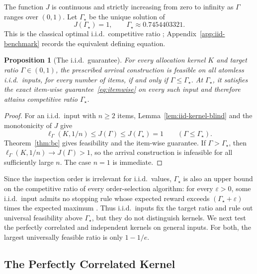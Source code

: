 \documentclass[11pt]{article}
\newtheorem{proposition}[theorem]{Proposition}
\theoremstyle{definition}
\theoremstyle{remark}
\begin{document}
The function $J$ is continuous and strictly increasing from zero to
infinity as $\Gamma$ ranges over $(0,1)$.
Let $\Gamma_\star$ be the unique solution of
\begin{equation}\label{eq:iid-constant}
 J(\Gamma_\star)=1,
 \qquad \Gamma_\star\approx0.7454403321.
\end{equation}
This is the classical optimal i.i.d.\ competitive ratio
\citep{HK82,Kertz86,CFHOV21}; Appendix~\ref{app:iid-benchmark}
records the equivalent defining equation.

\begin{proposition}[The i.i.d.\ guarantee]\label{prop:iid-guarantee}
For every allocation kernel $K$ and target ratio $\Gamma\in(0,1)$,
the prescribed arrival construction is feasible on all atomless
i.i.d.\ inputs, for every number of items,
if and only if $\Gamma\le\Gamma_\star$.
At $\Gamma_\star$, it satisfies the exact item-wise
guarantee~\eqref{eq:itemwise} on every such input and therefore
attains competitive ratio $\Gamma_\star$.
\end{proposition}
\begin{proof}
For an i.i.d.\ input with $n\ge2$ items, Lemma~\ref{lem:iid-kernel-blind}
and the monotonicity of $J$ give
\[
 \ell_\Gamma(K,1/n)\le J(\Gamma)\le J(\Gamma_\star)=1
 \qquad(\Gamma\le\Gamma_\star).
\]
Theorem~\ref{thm:bc} gives feasibility and the item-wise guarantee.
If $\Gamma>\Gamma_\star$, then
$\ell_\Gamma(K,1/n)\to J(\Gamma)>1$, so the arrival construction is
infeasible for all sufficiently large $n$.
The case $n=1$ is immediate.
\end{proof}

Since the inspection order is irrelevant for i.i.d.\ values, $\Gamma_\star$ is also an
upper bound on the competitive ratio of every order-selection algorithm: for every
$\varepsilon>0$, some i.i.d.\ input admits no stopping rule whose expected reward exceeds
$(\Gamma_\star+\varepsilon)$ times the expected maximum \citep{HK82,Kertz86}.
Thus i.i.d.\ inputs fix the target ratio and rule out universal
feasibility above $\Gamma_\star$, but they do not distinguish kernels.
We next test the perfectly correlated and independent kernels on
general inputs.  For both, the largest universally feasible ratio
is only $1-1/e$.


\subsection{The Perfectly Correlated Kernel}\label{sec:diagonal}
\end{document}
